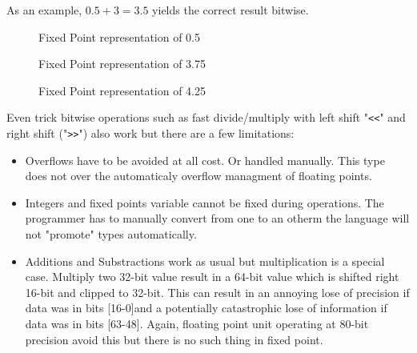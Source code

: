 As an example, $0.5 + 3 = 3.5$ yields the correct result bitwise.\\
\par
\begin{figure}[H]
  \centering
  
  \caption{Fixed Point representation of 0.5}
\end{figure}
\begin{figure}[H]
  \centering
  
  \caption{Fixed Point representation of 3.75}
\end{figure}
\begin{figure}[H]
  \centering
  
  \caption{Fixed Point representation of 4.25}
\end{figure}
\par
Even trick bitwise operations such as fast divide/multiply with left shift "\verb!<<!" and right shift ("\verb|>>|") also work but there are a few limitations:\\
\begin{itemize} 
\item Overflows have to be avoided at all cost. Or handled manually. This type does not over the automaticaly overflow managment of floating points.
\item Integers and fixed points variable cannot be fixed during operations. The programmer has to manually convert from one to an otherm the language will not "promote" types automatically.
\item Additions and Substractions work as usual but multiplication is a special case. Multiply two 32-bit value result in a 64-bit value which is shifted right 16-bit and clipped to 32-bit. This can result in an annoying lose of precision if data was in bits [16-0]and a potentially catastrophic lose of information if data was in bits [63-48]. Again, floating point unit operating at 80-bit precision avoid this but there is no such thing in fixed point.
\end{itemize}

\pagebreak

